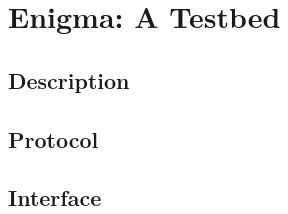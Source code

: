 
\chapter{Enigma: A Testbed} %
\label{Chapter5}


\section{Description}
\section{Protocol}
\section{Interface}